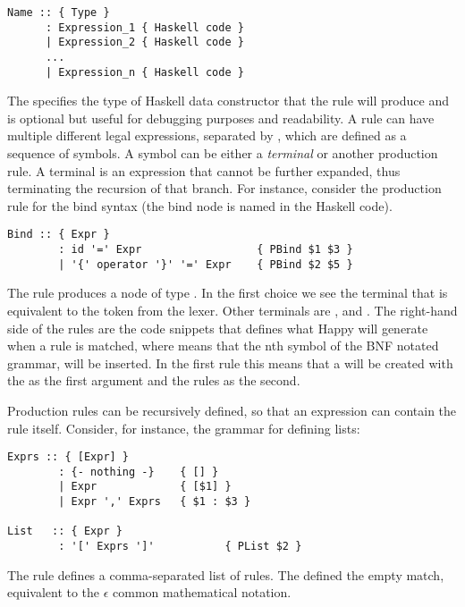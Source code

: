 \begin{lstlisting}
Name :: { Type }
      : Expression_1 { Haskell code }
      | Expression_2 { Haskell code }
      ...
      | Expression_n { Haskell code }
\end{lstlisting}

The  specifies the type of Haskell data constructor that the rule will produce and is optional but useful for debugging purposes and readability. A rule can have multiple different legal expressions, separated by \code{|}, which are defined as a sequence of symbols. A symbol can be either a \emph{terminal} or another production rule. A terminal is an expression that cannot be further expanded, thus terminating the recursion of that branch. For instance, consider the production rule for the bind syntax (the bind node is named  in the Haskell code).

\begin{lstlisting}
Bind :: { Expr }
        : id '=' Expr                  { PBind $1 $3 }
        | '{' operator '}' '=' Expr    { PBind $2 $5 }
\end{lstlisting}

The  rule produces a node of type . In the first choice we see the  terminal that is equivalent to the  token from the lexer. Other terminals are ,  and . The right-hand side of the rules are the code snippets that defines what Happy will generate when a rule is matched, where  means that the nth symbol of the BNF notated grammar, will be inserted. In the first rule this means that a  will be created with the  as the first argument and the  rules as the second.

Production rules can be recursively defined, so that an expression can contain the rule itself. Consider, for instance, the grammar for defining lists:

\begin{lstlisting}
Exprs :: { [Expr] }
        : {- nothing -}    { [] }
        | Expr             { [$1] }
        | Expr ',' Exprs   { $1 : $3 }

List   :: { Expr }
        : '[' Exprs ']'           { PList $2 }
\end{lstlisting}

The  rule defines a comma-separated list of  rules. The  defined the empty match, equivalent to the $\epsilon$ common mathematical notation.

